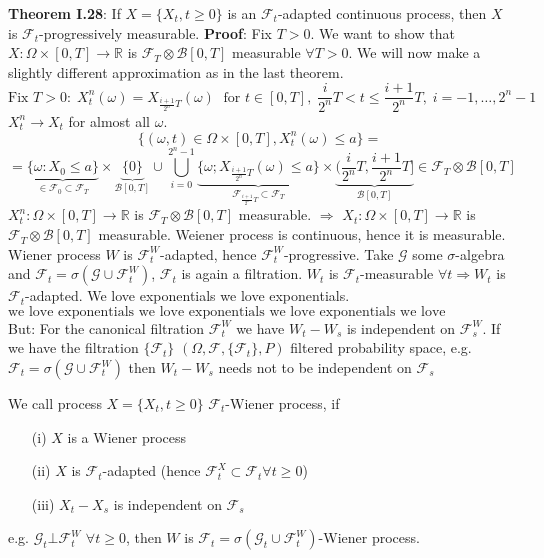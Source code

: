 \documentclass[english]{article}
\newcommand{\R}{\mathbb{R}}
\newcommand{\ub}{\underbrace}
\newcommand{\note}[1]{\noindent\textbf{#1}}
\newcommand{\F}{\mathcal F}
\newcommand{\B}{\mathcal B}
\begin{document}
\note{Theorem I.28}: If $X = \{X_t, t\geq 0\}$ is an $\F_t$-adapted continuous process, then $X$ is $\F_t$-progressively measurable. \newline
\textbf{Proof}: Fix $T>0$. We want to show that $X:\Omega \times [0,T] \to \R$ is $\F_T \otimes \mathcal B[0,T]$ measurable $\forall T>0$. We will now make a slightly different approximation as in the last theorem.
$$\text{Fix }T>0:\; X^n_t(\omega) = X_{\frac {i+1}{2^n} T} (\omega) \; \text{ for }t\in [0,T], \; \frac i{2^n}T < t \leq \frac{i+1}{2^n} T,\; i=-1,\dots, 2^n-1$$ 
$X^n_t \to X_t$ for almost all $\omega$.
$$\{(\omega, t) \in \Omega \times [0,T], X^n_t (\omega) \leq a \}= $$ $$= \ub{\{\omega: X_0 \leq a\}}_{\in \F_0 \subset \F_T} \times \ub{\{0\}}_{\B[0,T]} \cup \bigcup^{2^n-1}_{i=0} \ub{\{\omega; X_{\frac {i+1}{2^n}T} (\omega) \leq a \}}_{\F_{\frac{i+1}{2^n} T} \subset \F_T} \times \ub{\Big(\frac i{2^n}T, \frac{i+1}{2^n} T \Big]}_{\B[0,T]} \in \F_T \otimes \B[0,T]$$
$X^n_t : \Omega \times [0,T] \to \R$ is $\F_T \otimes \B[0,T]$ measurable. \newline
$\Rightarrow$ $X_t : \Omega \times [0,T] \to \R$ is $\F_T \otimes \B[0,T]$ measurable. \newline
Weiener process is continuous, hence it is measurable. \newline
Wiener process $W$ is $\F^W_t$-adapted, hence $\F^W_t$-progressive.\newline
Take $\mathcal G$ some $\sigma$-algebra and $\F_t = \sigma(\mathcal G \cup \F^W_t)$, $\F_t$ is again a filtration. \newline
$W_t$ is $\F_t$-measurable $\forall t \Rightarrow W_t$ is $\F_t$-adapted. We love exponentials we love exponentials. \newline
\vspace{-0.44cm}
$$\text{we love exponentials we love exponentials we love exponentials we love exponentials we love exponentials we love exponentials we love exponentials}$$
But: For the canonical filtration $\F^W_t$ we have $W_t -W_s$ is independent on $\F^W_s$. \newline
If we have the filtration $\{\F_t\}$ $(\Omega, \F, \{\F_t\}, P)$ filtered probability space, e.g. $\F_t = \sigma(\mathcal G \cup \F^W_t)$ then $W_t -W_s$ needs not to be independent on $\F_s$\newline

\noindent We call process $X=\{X_t, t\geq 0\}$ $\F_t$-Wiener process, if \begin{enumerate}
\item[(i)] $X$ is a Wiener process 
\item[(ii)] $X$ is $\F_t$-adapted (hence $\F^X_t \subset \F_t \forall t\geq 0$)
\item[(iii)] $X_t - X_s$ is independent on $\F_s$
\end{enumerate}
e.g. $\mathcal G_t \bot \F_t^W$ $\forall t\geq 0$, then $W$ is $\F_t = \sigma(\mathcal G_t \cup \F_t^W)$-Wiener process.\newline
\end{document}
